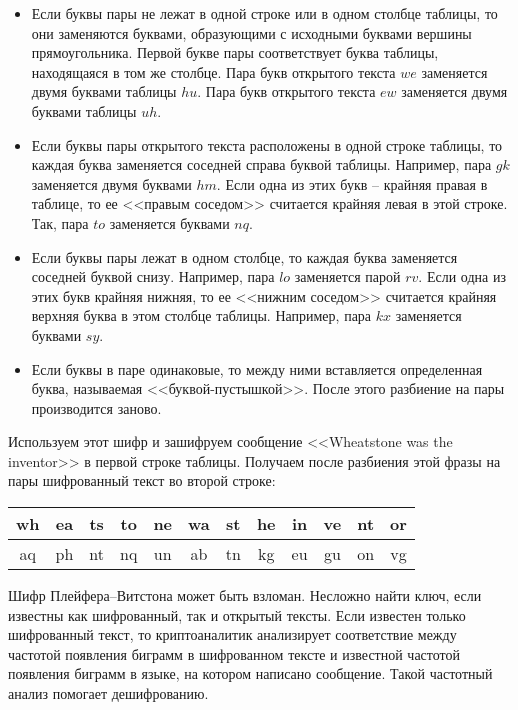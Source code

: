\begin{itemize}
    \item Если буквы пары не лежат в одной строке или в одном столбце таблицы, то они заменяются буквами, образующими с исходными буквами вершины прямоугольника. Первой букве пары соответствует буква таблицы, находящаяся в том же столбце. Пара букв открытого текста $we$ заменяется двумя буквами таблицы $hu$. Пара букв открытого текста $ew$ заменяется двумя буквами таблицы $uh$.
    \item Если буквы пары открытого текста расположены в одной строке таблицы, то каждая буква заменяется  соседней справа буквой таблицы. Например, пара $gk$  заменяется двумя буквами $hm$. Если одна из этих букв -- крайняя правая в таблице, то ее <<правым соседом>> считается крайняя левая в этой строке. Так, пара $to$ заменяется буквами $nq$.
    \item Если буквы пары лежат в одном столбце, то каждая буква заменяется  соседней буквой снизу. Например, пара $lo$ заменяется парой $rv$. Если одна из этих букв крайняя нижняя, то ее <<нижним соседом>> считается крайняя верхняя буква в этом столбце таблицы. Например, пара $kx$ заменяется буквами $sy$.
    \item Если буквы в паре одинаковые, то между ними вставляется определенная буква, называемая <<буквой-пустышкой>>. После этого разбиение на пары производится заново.
\end{itemize}

\example
Используем этот шифр и зашифруем сообщение <<Wheatstone was the inventor>> в первой строке таблицы. Получаем после разбиения этой фразы на пары шифрованный текст во второй строке:
\begin{center} \begin{tabular}{|cccccccccccc|}
    \hline
    wh & ea & ts & to & ne & wa & st & he & in & ve & nt & or \\
    \hline
    aq & ph & nt & nq & un & ab & tn & kg & eu & gu & on & vg \\
    \hline
\end{tabular} \end{center}
\exampleend

Шифр Плейфера--Витстона может быть  взломан. Несложно найти ключ, если известны как шифрованный, так и открытый тексты. Если известен только шифрованный текст, то криптоаналитик анализирует соответствие между частотой появления биграмм в шифрованном тексте и известной частотой появления биграмм в языке, на котором написано сообщение. Такой частотный анализ помогает дешифрованию.
